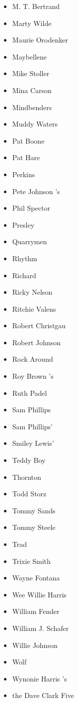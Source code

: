 \documentclass[12pt,a4paper]{article}
\begin{document}
\begin{itemize}
  \item M. T. Bertrand
  \item Marty Wilde
  \item Maurie Orodenker
  \item Maybellene
  \item Mike Stoller
  \item Mina Carson
  \item Mindbenders
  \item Muddy Waters
  \item Pat Boone
  \item Pat Hare
  \item Perkins
  \item Pete Johnson 's
  \item Phil Spector
  \item Presley
  \item Quarrymen
  \item Rhythm
  \item Richard
  \item Ricky Nelson
  \item Ritchie Valens
  \item Robert Christgau
  \item Robert Johnson
  \item Rock Around
  \item Roy Brown 's
  \item Ruth Padel
  \item Sam Phillips
  \item Sam Phillips'
  \item Smiley Lewis'
  \item Teddy Boy
  \item Thornton
  \item Todd Storz
  \item Tommy Sands
  \item Tommy Steele
  \item Trad
  \item Trixie Smith
  \item Wayne Fontana
  \item Wee Willie Harris
  \item William Fender
  \item William J. Schafer
  \item Willie Johnson
  \item Wolf
  \item Wynonie Harris 's
  \item the Dave Clark Five
\end{itemize}
\end{document}
